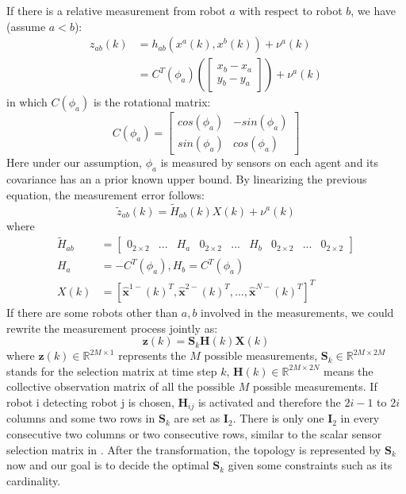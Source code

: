 \documentclass[conference]{IEEEtran}
\begin{document}
If there is a relative measurement from robot $a$ with respect to robot $b$, we have (assume $a<b$):
\begin{equation}
\begin{split}
z_{ab} (k) &= h_{ab}(x^a(k),x^b(k)) + \nu^a(k)
\\&= C^T(\phi_a) \left(\begin{bmatrix}
x_b - x_a \\ y_b - y_a
\end{bmatrix}\right)
+ \nu^a(k)
\end{split}
\end{equation}
in which $C(\phi_a)$ is the rotational matrix:
\begin{equation}
C(\phi_a) = \begin{bmatrix}
cos(\phi_a) & -sin(\phi_a) \\
sin(\phi_a) & cos(\phi_a)
\end{bmatrix}
\end{equation}
Here under our assumption, $\phi_a$ is measured by sensors on each agent and its covariance has an a prior known upper bound.
By linearizing the previous equation, the measurement error follows:
\begin{equation}
\tilde{z}_{ab}(k) = \tilde{H}_{ab}(k)X(k) + \nu^a(k)
\end{equation}
where
\begin{equation*}
\begin{split}
\tilde{H}_{ab} &= \begin{bmatrix}
0_{2\times2} &... &{H}_a &0_{2\times2}&...&H_b & 0_{2\times2} & ...&0_{2\times2}
\end{bmatrix}
\\
H_a &= -C^T(\phi_a),H_b = C^T(\phi_a)
\\
X(k) &= [\hat{\boldsymbol{x}}^{1-}(k)^T,\hat{\boldsymbol{x}}^{2-}(k)^T,...,\hat{\boldsymbol{x}}^{N-}(k)^T]^T
\end{split}
\end{equation*}
If there are some robots other than $a,b$ involved in the measurements, we could rewrite the measurement process jointly as:
\begin{equation}
	\boldsymbol{z}(k) = \boldsymbol{S}_k \boldsymbol{H}(k) \boldsymbol{X}(k)
\end{equation}
where $\boldsymbol{z}(k) \in \mathbb{R}^{2M\times1}$ represents the $M$ possible measurements, $\boldsymbol{S}_k\in \mathbb{R}^{2M\times2M}$ stands for the selection matrix at time step $k$, $\boldsymbol{H}(k) \in \mathbb{R}^{2M\times2N} $ means the collective observation matrix of  all the possible $M$ possible measurements.
If robot i detecting robot j is chosen, $\boldsymbol{H}_{ij}$ is activated and therefore the $2i-1$ to $2i$ columns and some two rows in $\boldsymbol{S}_k$ are set as $\boldsymbol{I}_2$.
There is only one $\boldsymbol{I}_2$ in every consecutive two columns or two consecutive rows, similar to the scalar sensor selection matrix in \cite{tzoumas2016sensor,tzoumas2018selecting,jawaid2015submodularity}.
After the transformation, the topology is represented by $\boldsymbol{S}_k$ now and our goal is to decide the optimal $\boldsymbol{S}_k$ given some constraints such as its cardinality.
\end{document}
